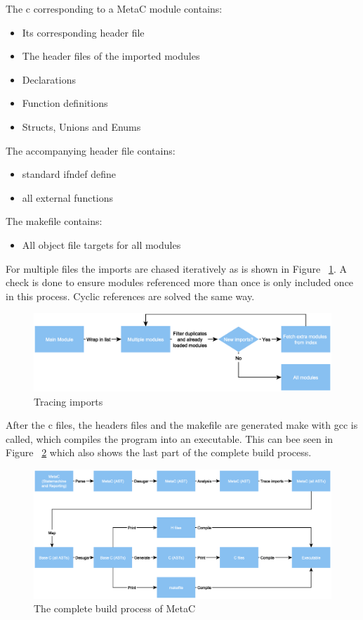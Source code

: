 \documentclass[a4paper,10pt,titlepage]{report}
\begin{document}
{\setlength{\parindent}{0cm}

The c corresponding to a MetaC module contains:
\begin{itemize}
\item Its corresponding header file
\item The header files of the imported modules
\item Declarations
\item Function definitions
\item Structs, Unions and Enums
\end{itemize}


The accompanying header file contains:
\begin{itemize}
\item standard ifndef define
\item all external functions
\end{itemize}

The makefile contains:
\begin{itemize}
\item All object file targets for all modules
\end{itemize}
}
For multiple files the imports are chased iteratively as is shown in Figure ~\ref{fig:trace_imports}. A check is done to ensure modules referenced more than once is only included once in this process. Cyclic references are solved the same way.

\begin{figure}
\centering
\includegraphics[width=\linewidth]{pics/tracing_imports.eps}
\caption{Tracing imports}
\label{fig:trace_imports}
\end{figure}

After the c files, the headers files and the makefile are generated make with gcc is called, which compiles the program into an executable. This can bee seen in Figure ~\ref{fig:compilation_complete} which also shows the last part of the complete build process.

\begin{figure}[ht!]
\centering
\includegraphics[width=\linewidth]{pics/compilation_complete.eps}
\caption{The complete build process of MetaC}
\label{fig:compilation_complete}
\end{figure}
\end{document}
